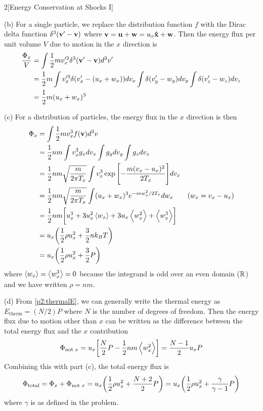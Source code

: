 \documentclass[12pt]{article}
\begin{document}
\begin{problem}{2}[Energy Conservation at Shocks I]
\begin{solution}
(b) For a single particle, we replace the distribution function $f$ with the
Dirac delta function $\delta^3(\vb{v}'-\vb{v})$ where
$\vb{v}=\vb{u}+\vb{w}=u_x\vb{\hat{x}}+\vb{w}$. Then the energy flux per unit volume $V$
due to motion in the $x$ direction is
\begin{align}
    \frac{\Phi_x}{V}
    &=\int\frac12mv_x'^3\delta^3(\vb{v}'-\vb{v})d^3v'\notag\\
    &=\frac12m\int v_x'^3\delta(v_x'-(u_x+w_x))dv_x
        \int \delta(v_y'-w_y)dv_y\int\delta(v_z'-w_z)dv_z\notag\\
    &=\frac12m(u_x+w_x)^3
\end{align}

(c) For a distribution of particles, the energy flux in the $x$ direction is
then
\begin{align}
    \Phi_x
    &=\int\frac12mv_x^3f(\vb{v})d^3v\notag\\
    &=\frac12nm\int v_x^3g_xdv_x\int g_ydv_y\int g_zdv_z\notag\\
    &=\frac12nm\sqrt{\frac{m}{2\pi T_x}}\int
    v_x^3\exp\qty[-\frac{m(v_x-u_x)^2}{2T_x}]dv_x\notag\\
    &=\frac12nm\sqrt{\frac{m}{2\pi
    T_x}}\int(u_x+w_x)^3e^{-mw_x^2/2T_x}dw_x\tag{$w_x=v_x-u_x$}\\
    &=\frac12nm\qty[u_x^3+3u_x^2\expval{w_x}+3u_x\expval{w_x^2}+\expval{w_x^3}]\notag\\
    &=u_x\qty(\frac12\rho u_x^2+\frac32nk_BT)\notag\\
    &=u_x\qty(\frac12\rho u_x^2+\frac32P)
\end{align}
where $\expval{w_x}=\expval{w_x^3}=0$ because the integrand is odd over an even
domain ($\mathbb{R}$) and we have written $\rho=nm$.

(d) From \eqref{p2:thermalE}, we can generally write the thermal energy as
$E_\text{therm}=(N /2)P$
where $N$ is the number of degrees of freedom. Then the energy flux due to
motion other than $x$ can be written as the difference between the total energy
flux and the $x$ contribution
\begin{equation}
    \Phi_\text{not
    $x$}=u_x\qty[\frac{N}{2}P-\frac12nm\expval{w_x^2}]=\frac{N-1}{2}u_xP
\end{equation}
Combining this with part (c), the total energy flux is
\begin{equation}
    \Phi_\text{total}
    =\Phi_x+\Phi_\text{not $x$}
    =u_x\qty(\frac12\rho u_x^2+\frac{N+2}{2}P)
    =u_x\qty(\frac12\rho u_x^2+\frac{\gamma}{\gamma-1}P)
\end{equation}
where $\gamma$ is as defined in the problem.
\end{solution}
\end{problem}
\end{document}
